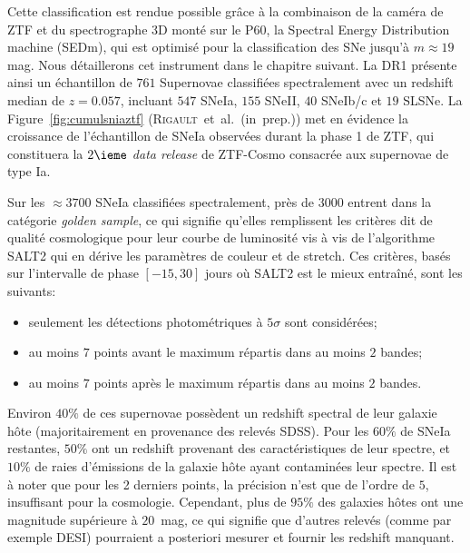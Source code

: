 \documentclass[../main/main.tex]{subfiles}
\begin{document}
Cette classification est rendue possible grâce à la combinaison de la
caméra de ZTF et du spectrographe 3D monté sur le P60, la Spectral
Energy Distribution machine (SEDm), qui est optimisé pour la
classification des SNe jusqu'à $m\approx19$ mag. Nous détaillerons cet instrument
dans le chapitre suivant. La DR1
présente ainsi un échantillon de $761$ Supernovae classifiées
spectralement avec un redshift median de $z=0.057$, incluant $547$ SNeIa, $155$ SNeII, $40$ SNeIb/c et $19$ SLSNe.
La Figure~\ref{fig:cumulsniaztf} (\mbox{\textsc{Rigault} et al. (in prep.)}) met en évidence la croissance de
l'échantillon de SNeIa observées durant la phase 1 de ZTF, qui
constituera la $2\ieme$ \textit{data release} de ZTF-Cosmo consacrée aux supernovae de
type Ia.

Sur les $\approx3700$ SNeIa classifiées spectralement, près de
$3000$ entrent dans la catégorie \textit{golden sample}, ce qui
signifie qu'elles remplissent les critères dit de qualité cosmologique
pour leur courbe de luminosité vis à vis de l'algorithme SALT2 qui en
dérive les paramètres de couleur et de stretch. Ces
critères, basés sur l'intervalle de phase $[-15,30]$ jours où SALT2 est
le mieux entraîné, sont les suivants:

\begin{itemize}[label=$\diamondsuit$]
  \itemsep0em 
   \item seulement les détections photométriques à $5\sigma$ sont
     considérées;
   \item au moins $7$ points avant le maximum répartis dans au moins $2$ bandes;
   \item au moins $7$ points après le maximum répartis dans au moins $2$ bandes.
\end{itemize}

Environ $40\%$ de ces supernovae possèdent un redshift spectral de leur
galaxie hôte (majoritairement en provenance des relevés SDSS). Pour les
$60\%$ de SNeIa restantes, $50\%$
ont un redshift provenant des
caractéristiques de leur spectre, et $10\%$ de
raies d'émissions de la galaxie hôte ayant contaminées leur spectre. Il est à noter que pour les 2 derniers points, la précision n'est
que de l'ordre de $5$\textperthousand, insuffisant pour la cosmologie.
Cependant, plus de $95\%$ des galaxies hôtes ont une magnitude supérieure
à $20$~mag, ce qui signifie que d'autres relevés (comme par exemple
DESI) pourraient a posteriori mesurer et fournir les redshift manquant.
\end{document}
